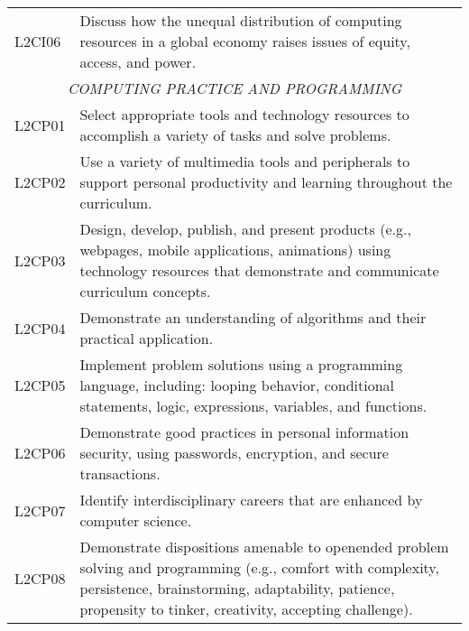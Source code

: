 \begin{longtable}{p{1.8cm}p{11cm}}
 L2CI06  & Discuss how the unequal distribution of computing resources in a global economy raises issues of equity, access, and power.                                                                                                \\
 \multicolumn{2}{c}{\textit{COMPUTING PRACTICE AND PROGRAMMING}}                                                                                                                                                                                          \\
 L2CP01  & Select appropriate tools and technology resources to accomplish a variety of tasks and solve problems.                                                                                                                     \\
 L2CP02  & Use a variety of multimedia tools and peripherals to support personal productivity and learning throughout the curriculum.                                                                                                 \\
 L2CP03  & Design, develop, publish, and present products (e.g., webpages, mobile applications, animations) using technology resources that demonstrate and communicate curriculum concepts.                                          \\
 L2CP04  & Demonstrate an understanding of algorithms and their practical application.                                                                                                                                                \\
 L2CP05  & Implement problem solutions using a programming language, including: looping behavior, conditional statements, logic, expressions, variables, and functions.                                                               \\
 L2CP06  & Demonstrate good practices in personal information security, using passwords, encryption, and secure transactions.                                                                                                         \\
 L2CP07  & Identify interdisciplinary careers that are enhanced by computer science.                                                                                                                                                  \\
 L2CP08  & Demonstrate dispositions amenable to openended problem solving and programming (e.g., comfort with complexity, persistence, brainstorming, adaptability, patience, propensity to tinker, creativity, accepting challenge). \\

\end{longtable}
